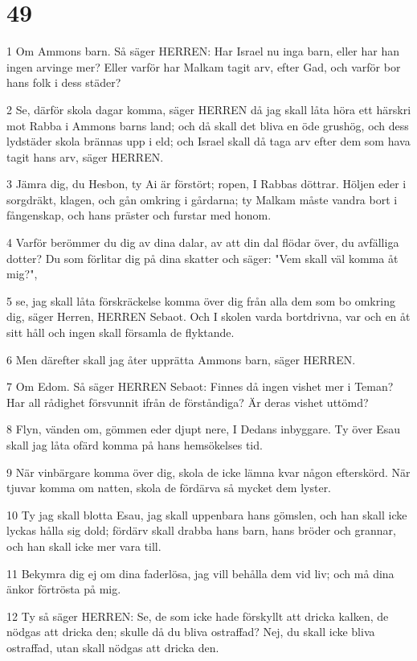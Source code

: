 \chapter{49}

\par 1 Om Ammons barn. Så säger HERREN: Har Israel nu inga barn, eller har han ingen arvinge mer? Eller varför har Malkam tagit arv, efter Gad, och varför bor hans folk i dess städer?
\par 2 Se, därför skola dagar komma, säger HERREN då jag skall låta höra ett härskri mot Rabba i Ammons barns land; och då skall det bliva en öde grushög, och dess lydstäder skola brännas upp i eld; och Israel skall då taga arv efter dem som hava tagit hans arv, säger HERREN.
\par 3 Jämra dig, du Hesbon, ty Ai är förstört; ropen, I Rabbas döttrar. Höljen eder i sorgdräkt, klagen, och gån omkring i gårdarna; ty Malkam måste vandra bort i fångenskap, och hans präster och furstar med honom.
\par 4 Varför berömmer du dig av dina dalar, av att din dal flödar över, du avfälliga dotter? Du som förlitar dig på dina skatter och säger: "Vem skall väl komma åt mig?",
\par 5 se, jag skall låta förskräckelse komma över dig från alla dem som bo omkring dig, säger Herren, HERREN Sebaot. Och I skolen varda bortdrivna, var och en åt sitt håll och ingen skall församla de flyktande.
\par 6 Men därefter skall jag åter upprätta Ammons barn, säger HERREN.
\par 7 Om Edom. Så säger HERREN Sebaot: Finnes då ingen vishet mer i Teman? Har all rådighet försvunnit ifrån de förståndiga? Är deras vishet uttömd?
\par 8 Flyn, vänden om, gömmen eder djupt nere, I Dedans inbyggare. Ty över Esau skall jag låta ofärd komma på hans hemsökelses tid.
\par 9 När vinbärgare komma över dig, skola de icke lämna kvar någon efterskörd. När tjuvar komma om natten, skola de fördärva så mycket dem lyster.
\par 10 Ty jag skall blotta Esau, jag skall uppenbara hans gömslen, och han skall icke lyckas hålla sig dold; fördärv skall drabba hans barn, hans bröder och grannar, och han skall icke mer vara till.
\par 11 Bekymra dig ej om dina faderlösa, jag vill behålla dem vid liv; och må dina änkor förtrösta på mig.
\par 12 Ty så säger HERREN: Se, de som icke hade förskyllt att dricka kalken, de nödgas att dricka den; skulle då du bliva ostraffad? Nej, du skall icke bliva ostraffad, utan skall nödgas att dricka den.
